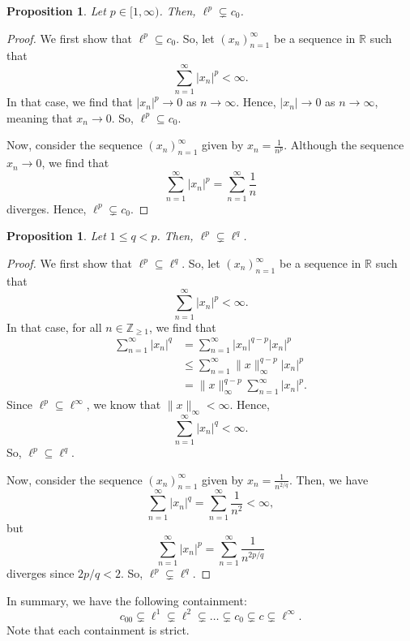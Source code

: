 \documentclass[a4paper, openany]{memoir}
\theoremstyle{definition}
\theoremstyle{plain}
\newtheorem{proposition}[definition]{Proposition}
\begin{document}
    \begin{proposition}
        Let $p \in [1, \infty)$. Then, $\ell^p \subsetneq c_0$.
    \end{proposition}
    \begin{proof}
        We first show that $\ell^p \subseteq c_0$. So, let $(x_n)_{n=1}^\infty$ be a sequence in $\mathbb{R}$ such that
        \[\sum_{n=1}^\infty |x_n|^p < \infty.\]
        In that case, we find that $|x_n|^p \to 0$ as $n \to \infty$. Hence, $|x_n| \to 0$ as $n \to \infty$, meaning that $x_n \to 0$. So, $\ell^p \subseteq c_0$.

        Now, consider the sequence $(x_n)_{n=1}^\infty$ given by $x_n = \frac{1}{n^p}$. Although the sequence $x_n \to 0$, we find that
        \[\sum_{n=1}^\infty |x_n|^p = \sum_{n=1}^\infty \frac{1}{n}\]
        diverges. Hence, $\ell^p \subsetneq c_0$.
    \end{proof}

    \begin{proposition}
        Let $1 \leq q < p$. Then, $\ell^p \subsetneq \ell^q$.
    \end{proposition}
    \begin{proof}
        We first show that $\ell^p \subseteq \ell^q$. So, let $(x_n)_{n=1}^\infty$ be a sequence in $\mathbb{R}$ such that
        \[\sum_{n=1}^\infty |x_n|^p < \infty.\]
        In that case, for all $n \in \mathbb{Z}_{\geq 1}$, we find that
        \begin{align*}
            \sum_{n=1}^\infty |x_n|^q &= \sum_{n=1}^\infty |x_n|^{q-p} |x_n|^{p} \\
            &\leq \sum_{n=1}^\infty \lVert x \rVert_\infty^{q-p} |x_n|^p \\
            &= \lVert x \rVert_\infty^{q-p} \sum_{n=1}^\infty |x_n|^p.
        \end{align*}
        Since $\ell^p \subseteq \ell^\infty$, we know that $\lVert x \rVert_\infty < \infty$. Hence, 
        \[\sum_{n=1}^\infty |x_n|^q < \infty.\]
        So, $\ell^p \subseteq \ell^q$.

        Now, consider the sequence $(x_n)_{n=1}^\infty$ given by $x_n = \frac{1}{n^{2/q}}$. Then, we have
        \[\sum_{n=1}^\infty |x_n|^q = \sum_{n=1}^\infty \frac{1}{n^2} < \infty,\]
        but
        \[\sum_{n=1}^\infty |x_n|^p = \sum_{n=1}^\infty \frac{1}{n^{2p/q}}\]
        diverges since $2p/q < 2$. So, $\ell^p \subsetneq \ell^q$.
    \end{proof}
    
    In summary, we have the following containment:
    \[c_{00} \subsetneq \ell^1 \subsetneq \ell^2 \subsetneq \dots \subsetneq c_0 \subsetneq c \subsetneq \ell^\infty.\]
    Note that each containment is strict.
    
\end{document}
